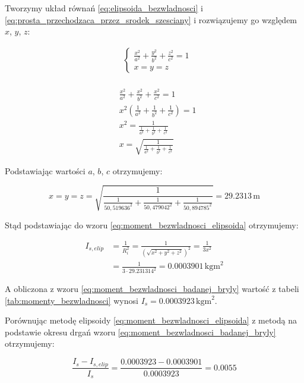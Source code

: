\documentclass[a4paper,12pt]{article}
\begin{document}
Tworzymy układ równań \eqref{eq:elipsoida_bezwladnosci} i \eqref{eq:prosta_przechodzaca_przez_srodek_szesciany} i rozwiązujemy go względem $x$, $y$, $z$:

\begin{align*} \label{eq:rozwiazanie_ukladu_rownan}
     & \begin{cases}
           \frac{x^2}{a^2} + \frac{y^2}{b^2} + \frac{z^2}{c^2}  = 1 \\
           x = y = z
       \end{cases} \\[1em]
\end{align*}

\begin{align*}
     & \frac{x^2}{a^2} + \frac{x^2}{b^2} + \frac{x^2}{c^2} = 1              \\
     & x^2 \left( \frac{1}{a^2} + \frac{1}{b^2} + \frac{1}{c^2} \right) = 1 \\
     & x^2 = \frac{1}{\frac{1}{a^2} + \frac{1}{b^2} + \frac{1}{c^2}}        \\
     & x = \sqrt{\frac{1}{\frac{1}{a^2} + \frac{1}{b^2} + \frac{1}{c^2}}}
\end{align*}

Podstawiając wartości $a$, $b$, $c$ otrzymujemy:

\begin{equation*}
    x = y = z = \sqrt{\frac{1}{\frac{1}{50,519636^2} + \frac{1}{50,479042^2} + \frac{1}{50,894785^2}}} = 29.2313\,\text{m}
\end{equation*}

Stąd podstawiając do wzoru \eqref{eq:moment_bezwladnosci_elipsoida} otrzymujemy:

\begin{align*}
    I_{s, elip} & = \frac{1}{R_i^2} = \frac{1}{(\sqrt{x^2 + y^2 + z^2})^2}  = \frac{1}{3x^2} \\
                & = \frac{1}{ 3 \cdot 29.231314^2} = 0.0003901\,\text{kgm}^2
\end{align*}


A obliczona z wzoru \eqref{eq:moment_bezwladnosci_badanej_bryly} wartość z tabeli \ref{tab:momenty_bezwladnosci} wynosi $I_s = 0.0003923\,\text{kgm}^2$.

Porównując metodę elipsoidy \eqref{eq:moment_bezwladnosci_elipsoida} z metodą na podstawie okresu   drgań wzoru \eqref{eq:moment_bezwladnosci_badanej_bryly} otrzymujemy:

\begin{equation*}
    \frac{I_s - I_{s,elip}}{I_s} = \frac{0.0003923 - 0.0003901}{0.0003923} = 0.0055
\end{equation*}
\end{document}
